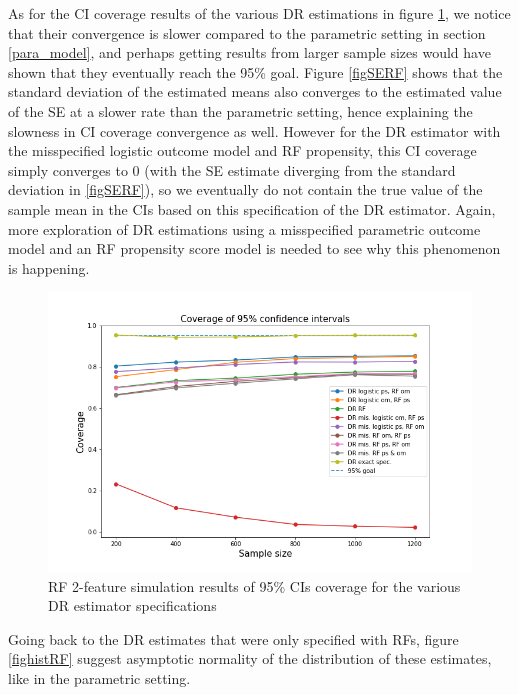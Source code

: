 \documentclass[12pt,twoside]{article}
\begin{document}
As for the CI coverage results of the various DR estimations in figure \ref{figCIRF}, we notice that their convergence is slower compared to the parametric setting in section \ref{para_model}, and perhaps getting results from larger sample sizes would have shown that they eventually reach the 95\% goal. Figure \ref{figSERF} shows that the standard deviation of the estimated means also converges to the estimated value of the SE at a slower rate than the parametric setting, hence explaining the slowness in CI coverage convergence as well. However for the DR estimator with the misspecified logistic outcome model and RF propensity, this CI coverage simply converges to 0 (with the SE estimate diverging from the standard deviation in \ref{figSERF}), so we eventually do not contain the true value of the sample mean in the CIs based on this specification of the DR estimator. Again, more exploration of DR estimations using a misspecified parametric outcome model and an RF propensity score model is needed to see why this phenomenon is happening.

\begin{figure}[h!]
    \centering
    \includegraphics[width = 0.9\columnwidth]{figures/CIRF.png}
    \caption{RF 2-feature simulation results of 95\% CIs coverage for the various DR estimator specifications}
    \label{figCIRF}
\end{figure}

Going back to the DR estimates that were only specified with RFs, figure \ref{fighistRF} suggest asymptotic normality of the distribution of these estimates, like in the parametric setting. \\
\end{document}

